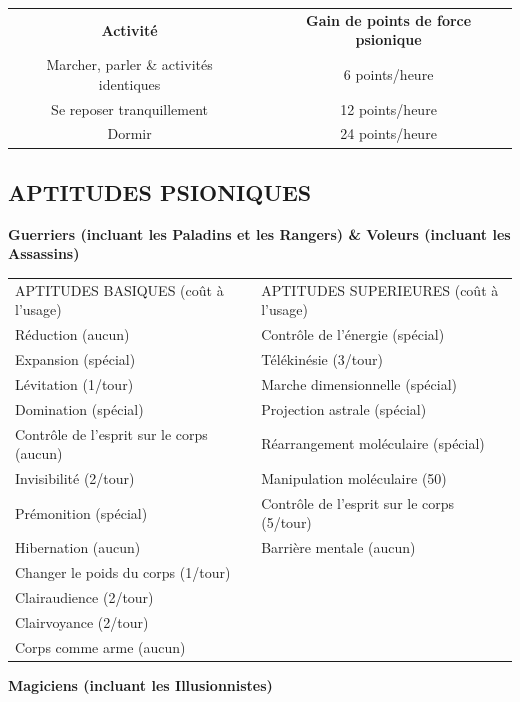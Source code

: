 \documentclass[11pt]{article}
\begin{document}
{\begin{center}
\begin{tabular}{cp{0.3cm}c}
\textbf{Activité} && \textbf{Gain de points de force psionique} \\
Marcher, parler \& activités identiques && 6 points/heure \\
Se reposer tranquillement && 12 points/heure \\
Dormir && 24 points/heure \\
\end{tabular}
\end{center}

\newpage
\subsection*{\normalsize APTITUDES PSIONIQUES}
\textbf{Guerriers (incluant les Paladins et les Rangers) \& Voleurs (incluant les Assassins)}

\bigskip

\begin{tabular}{p{7.5cm}p{0.3cm}p{7.5cm}}
APTITUDES BASIQUES (coût à l'usage) && APTITUDES SUPERIEURES (coût à l'usage) \\
Réduction (aucun) && Contrôle de l'énergie (spécial) \\
Expansion (spécial) && Télékinésie (3/tour) \\
Lévitation (1/tour) && Marche dimensionnelle (spécial) \\
Domination (spécial) && Projection astrale (spécial) \\
Contrôle de l'esprit sur le corps (aucun) && Réarrangement moléculaire (spécial) \\
Invisibilité (2/tour) && Manipulation moléculaire (50) \\
Prémonition (spécial) && Contrôle de l'esprit sur le corps (5/tour) \\
Hibernation (aucun) && Barrière mentale (aucun) \\
Changer le poids du corps (1/tour) && \\
Clairaudience (2/tour) && \\
Clairvoyance (2/tour) && \\
Corps comme arme (aucun) && \\
\end{tabular}

\bigskip

\textbf{Magiciens (incluant les Illusionnistes)}

\bigskip

}
\end{document}

